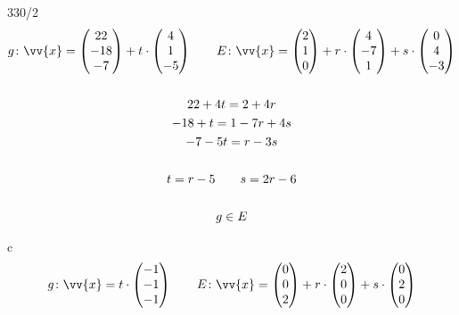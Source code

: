 \begin{exercise}{330/2}
\begin{gather*}
    g \colon \vv{x} = \begin{pmatrix}22 \\ -18 \\ -7\end{pmatrix} + t \cdot \begin{pmatrix}4 \\ 1 \\ -5\end{pmatrix} \qquad E \colon \vv{x} = \begin{pmatrix}2 \\ 1 \\ 0\end{pmatrix} + r \cdot \begin{pmatrix}4 \\ -7 \\ 1\end{pmatrix} + s \cdot \begin{pmatrix}0 \\ 4 \\ -3\end{pmatrix} \\\\
    22 + 4t = 2 + 4r \\
    -18 + t = 1 - 7r + 4s \\
    -7 - 5t = r - 3s \\\\
    t = r - 5 \qquad s = 2r - 6 \\\\
    g \in E
  \end{gather*}
  \item [c]
  \begin{gather*}
    g \colon \vv{x} = t \cdot \begin{pmatrix}-1 \\ -1 \\ -1\end{pmatrix} \qquad E \colon \vv{x} = \begin{pmatrix}0 \\ 0 \\ 2\end{pmatrix} + r \cdot \begin{pmatrix}2 \\ 0 \\ 0\end{pmatrix} + s \cdot \begin{pmatrix}0 \\ 2 \\ 0\end{pmatrix} \\\\

\end{gather*}
\end{exercise}
